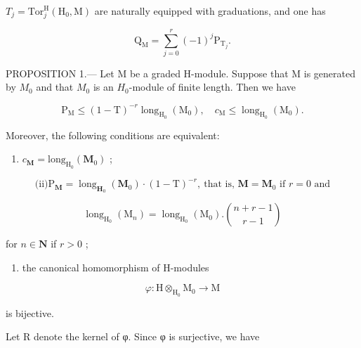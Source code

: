 \(T_{j} = \text{Tor}_{j}^{\text{H}}(\text{H}_{0}, \text{M})\) are naturally equipped with graduations, and one has

\[
\mathrm{Q} _ {\mathrm{M}} = \sum_ {j = 0} ^ {r} (- 1) ^ {j} \mathrm{P} _ {\mathrm{T} _ {j}}.
\]

PROPOSITION 1.--- Let M be a graded H-module. Suppose that M is generated by \(M_{0}\) and that \(M_{0}\) is an \(H_{0}\)-module of finite length. Then we have

\[
\mathrm{P} _ {\mathrm{M}} \leqslant (1 - \mathrm{T}) ^ {- r} \operatorname{long} _ {\mathrm{H} _ {0}} (\mathrm{M} _ {0}), \quad c _ {\mathrm{M}} \leqslant \operatorname{long} _ {\mathrm{H} _ {0}} (\mathrm{M} _ {0}).
\]

Moreover, the following conditions are equivalent:

\begin{enumerate}
\def\labelenumi{(\roman{enumi})}
\tightlist
\item
  \(c_{\mathbf{M}} = \mathrm{long}_{\mathrm{H_0}}(\mathbf{M}_0)\) ;
\end{enumerate}

\[
\text{(ii)} \mathrm{P}_{\mathbf{M}} = \operatorname{long}_{\mathbf{H}_{0}}(\mathbf{M}_{0}) \cdot (1 - \mathrm{T})^{-r},\ \text{that is, }\mathbf{M} = \mathbf{M}_{0}\text{ if }r=0\text{ and}
\]

\[
\operatorname{long} _ {\mathrm{H} _ {0}} \left(\mathrm{M} _ {n}\right) = \operatorname{long} _ {\mathrm{H} _ {0}} \left(\mathrm{M} _ {0}\right). \binom {n + r - 1} {r - 1}
\]

for \(n \in \mathbf{N}\) if \(r > 0\) ;

\begin{enumerate}
\def\labelenumi{(\roman{enumi})}
\setcounter{enumi}{2}
\tightlist
\item
  the canonical homomorphism of H-modules
\end{enumerate}

\[
\varphi : \mathrm{H} \otimes_ {\mathrm{H} _ {0}} \mathrm{M} _ {0} \rightarrow \mathrm{M}
\]

is bijective.

Let R denote the kernel of φ. Since φ is surjective, we have

